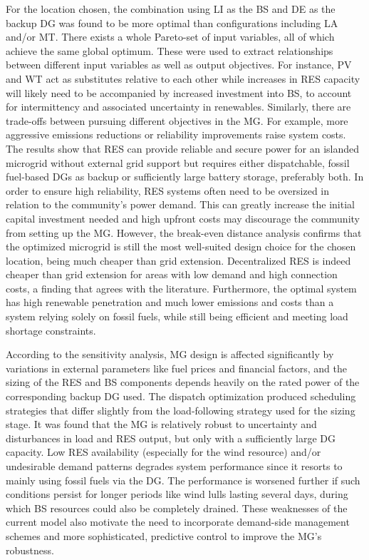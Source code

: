 \documentclass[final,3p,times]{elsarticle}
\begin{document}
For the location chosen, the combination using LI as the BS and DE as the backup DG was found to be more optimal than configurations including LA and/or MT. There exists a whole Pareto-set of input variables, all of which achieve the same global optimum. These were used to extract relationships between different input variables as well as output objectives. For instance, PV and WT act as substitutes relative to each other while increases in RES capacity will likely need to be accompanied by increased investment into BS, to account for intermittency and associated uncertainty in renewables. Similarly, there are trade-offs between pursuing different objectives in the MG. For example, more aggressive emissions reductions or reliability improvements raise system costs. The results show that RES can provide reliable and secure power for an islanded microgrid without external grid support but requires either dispatchable, fossil fuel-based DGs as backup or sufficiently large battery storage, preferably both. In order to ensure high reliability, RES systems often need to be oversized in relation to the community's power demand. This can greatly increase the initial capital investment needed and high upfront costs may discourage the community from setting up the MG. However, the break-even distance analysis confirms that the optimized microgrid is still the most well-suited design choice for the chosen location, being much cheaper than grid extension. Decentralized RES is indeed cheaper than grid extension for areas with low demand and high connection costs, a finding that agrees with the literature. Furthermore, the optimal system has high renewable penetration and much lower emissions and costs than a system relying solely on fossil fuels, while still being efficient and meeting load shortage constraints.

According to the sensitivity analysis, MG design is affected significantly by variations in external parameters like fuel prices and financial factors, and the sizing of the RES and BS components depends heavily on the rated power of the corresponding backup DG used. The dispatch optimization produced scheduling strategies that differ slightly from the load-following strategy used for the sizing stage. It was found that the MG is relatively robust to uncertainty and disturbances in load and RES output, but only with a sufficiently large DG capacity. Low RES availability (especially for the wind resource) and/or undesirable demand patterns degrades system performance since it resorts to mainly using fossil fuels via the DG. The performance is worsened further if such conditions persist for longer periods like wind lulls lasting several days, during which BS resources could also be completely drained. These weaknesses of the current model also motivate the need to incorporate demand-side management schemes and more sophisticated, predictive control to improve the MG's robustness.
\end{document}
